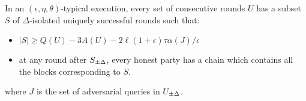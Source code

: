 \begin{lemma}[Unsuppressibility]
  In an $(\epsilon, \eta, \theta)$-typical execution, every set of consecutive
  rounds $U$ has a subset $S$ of $\Delta$-isolated uniquely successful rounds
  such that:
  \begin{itemize}
    \item $|S| \geq Q(U) - 3A(U) - 2\ell(1 + \epsilon)\tau\alpha(J)/\epsilon$
    \item at any round after $S_{\pm\Delta}$, every honest party has a
          chain which contains all the blocks corresponding to $S$.
  \end{itemize}
  where $J$ is the set of adversarial queries in $U_{\pm\Delta}$.
\end{lemma}
